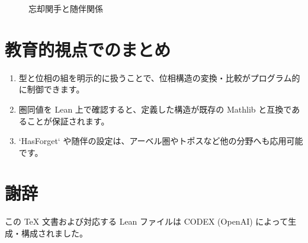 \documentclass[12pt]{ltjsarticle}
\begin{document}
\begin{figure}[htbp]
  \centering
  \caption{忘却関手と随伴関係}
\end{figure}

\section{教育的視点でのまとめ}
\begin{enumerate}[label=\arabic*)]
  \item 型と位相の組を明示的に扱うことで、位相構造の変換・比較がプログラム的に制御できます。
  \item 圏同値を Lean 上で確認すると、定義した構造が既存の Mathlib と互換であることが保証されます。
  \item `HasForget` や随伴の設定は、アーベル圏やトポスなど他の分野へも応用可能です。
\end{enumerate}

\section*{謝辞}
この TeX 文書および対応する Lean ファイルは CODEX (OpenAI) によって生成・構成されました。
\end{document}
